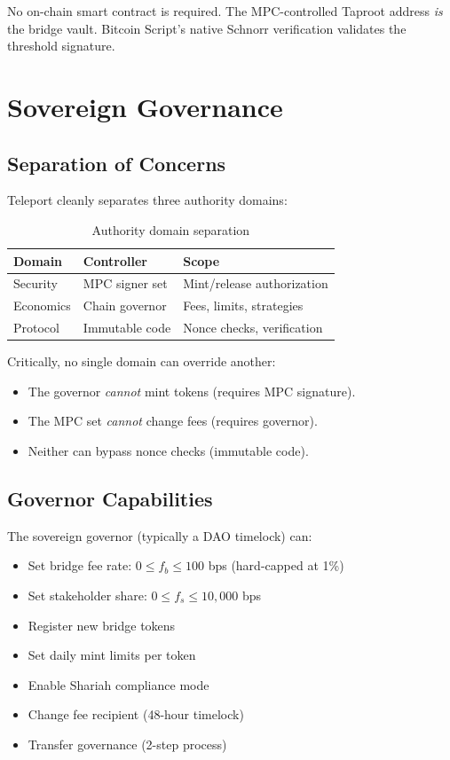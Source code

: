 \documentclass[11pt,twocolumn]{article}
\begin{document}
No on-chain smart contract is required. The MPC-controlled Taproot address \emph{is} the bridge vault. Bitcoin Script's native Schnorr verification validates the threshold signature.

\section{Sovereign Governance}

\subsection{Separation of Concerns}

Teleport cleanly separates three authority domains:

\begin{table}[h]
\centering
\small
\begin{tabular}{lll}
\toprule
\textbf{Domain} & \textbf{Controller} & \textbf{Scope} \\
\midrule
Security & MPC signer set & Mint/release authorization \\
Economics & Chain governor & Fees, limits, strategies \\
Protocol & Immutable code & Nonce checks, verification \\
\bottomrule
\end{tabular}
\caption{Authority domain separation}
\label{tab:separation}
\end{table}

\noindent
Critically, no single domain can override another:
\begin{itemize}[nosep]
  \item The governor \emph{cannot} mint tokens (requires MPC signature).
  \item The MPC set \emph{cannot} change fees (requires governor).
  \item Neither can bypass nonce checks (immutable code).
\end{itemize}

\subsection{Governor Capabilities}

The sovereign governor (typically a DAO timelock) can:
\begin{itemize}[nosep]
  \item Set bridge fee rate: $0 \leq f_b \leq 100$ bps (hard-capped at 1\%)
  \item Set stakeholder share: $0 \leq f_s \leq 10{,}000$ bps
  \item Register new bridge tokens
  \item Set daily mint limits per token
  \item Enable Shariah compliance mode
  \item Change fee recipient (48-hour timelock)
  \item Transfer governance (2-step process)
\end{itemize}
\end{document}
